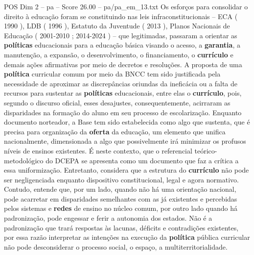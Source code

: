 \begin{textsample}{POS Dim 2 – pa – Score 26.00 – pa/pa\_em\_13.txt}
Os esforços para consolidar o direito à educação foram se constituindo nas leis infraconstitucionais – ECA ( 1990 ), LDB ( 1996 ), Estatuto da Juventude ( 2013 ), Planos Nacionais de Educação ( 2001-2010 ; 2014-2024 ) – que legitimadas, passaram a orientar as \textbf{políticas} educacionais para a educação básica visando o acesso, a \textbf{garantia}, a manutenção, a expansão, o desenvolvimento, o financiamento, o \textbf{currículo} e demais ações afirmativas por meio de decretos e resoluções.
A proposta de uma \textbf{política} curricular comum por meio da BNCC tem sido justificada pela necessidade de aproximar as discrepâncias oriundas da ineficácia ou a falta de recursos para sustentar as \textbf{políticas} educacionais, entre elas o \textbf{currículo}, pois, segundo o discurso oficial, esses desajustes, consequentemente, acirraram as disparidades na formação do aluno em seu processo de escolarização.
Enquanto documento norteador, a Base tem sido estabelecida como algo que sustenta, que é precisa para organização da \textbf{oferta} da educação, um elemento que unifica nacionalmente, dimensionada a algo que possivelmente irá minimizar os profusos níveis de ensinos existentes.
É neste contexto, que o referencial teórico-metodológico do DCEPA se apresenta como um documento que faz a crítica a essa uniformização.
Entretanto, considera que a estrutura do \textbf{currículo} não pode ser negligenciada enquanto dispositivo constitucional, legal e agora normativo.
Contudo, entende que, por um lado, quando não há uma orientação nacional, pode acarretar em disparidades semelhantes com as já existentes e percebidas pelos sistemas e \textbf{redes} de ensino no núcleo comum, por outro lado quando há padronização, pode engessar e ferir a autonomia dos estados.
Não é a padronização que trará respostas às lacunas, déficits e contradições existentes, por essa razão interpretar as intenções na execução da \textbf{política} pública curricular não pode desconsiderar o processo social, o espaço, a multiterritorialidade.

\end{textsample}
